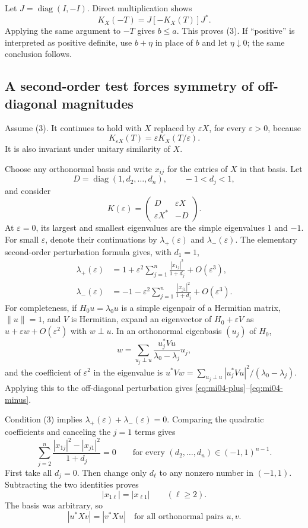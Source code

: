 \documentclass[10pt,a4paper]{article}
\theoremstyle{remark}
\newcommand{\diag}{\operatorname{diag}}
\begin{document}
Let $J=\diag(I,-I)$. Direct multiplication shows
\[
 K_X(-T)=J[-K_X(T)]J^*.
\]
Applying the same argument to $-T$ gives $b\leq a$. This proves (3).
If ``positive'' is interpreted as positive definite, use $b+\eta$ in place of $b$ and let $\eta\downarrow0$; the same conclusion follows.

\subsection{A second-order test forces symmetry of off-diagonal magnitudes}

Assume (3). It continues to hold with $X$ replaced by $\varepsilon X$, for every $\varepsilon>0$, because
\[
 K_{\varepsilon X}(T)=\varepsilon K_X(T/\varepsilon).
\]
It is also invariant under unitary similarity of $X$.

Choose any orthonormal basis and write $x_{ij}$ for the entries of $X$ in that basis. Let
\[
 D=\diag(1,d_2,\ldots,d_n),\qquad -1<d_j<1,
\]
and consider
\[
 K(\varepsilon)=\begin{pmatrix}D&\varepsilon X\\\varepsilon X^*&-D\end{pmatrix}.
\]
At $\varepsilon=0$, its largest and smallest eigenvalues are the simple eigenvalues $1$ and $-1$. For small $\varepsilon$, denote their continuations by $\lambda_+(\varepsilon)$ and $\lambda_-(\varepsilon)$. The elementary second-order perturbation formula gives, with $d_1=1$,
\begin{align}
 \lambda_+(\varepsilon)
 &=1+\varepsilon^2\sum_{j=1}^n\frac{|x_{1j}|^2}{1+d_j}
   +O(\varepsilon^3),\label{eq:mi04-plus}\\
 \lambda_-(\varepsilon)
 &=-1-\varepsilon^2\sum_{j=1}^n\frac{|x_{j1}|^2}{1+d_j}
   +O(\varepsilon^3).\label{eq:mi04-minus}
\end{align}
For completeness, if $H_0u=\lambda_0u$ is a simple eigenpair of a Hermitian matrix, $\|u\|=1$, and $V$ is Hermitian, expand an eigenvector of $H_0+\varepsilon V$ as $u+\varepsilon w+O(\varepsilon^2)$ with $w\perp u$. In an orthonormal eigenbasis $(u_j)$ of $H_0$,
\[
 w=\sum_{u_j\perp u}\frac{u_j^*Vu}{\lambda_0-\lambda_j}u_j,
\]
and the coefficient of $\varepsilon^2$ in the eigenvalue is
$u^*Vw=\sum_{u_j\perp u}|u_j^*Vu|^2/(\lambda_0-\lambda_j)$.
Applying this to the off-diagonal perturbation gives \eqref{eq:mi04-plus}--\eqref{eq:mi04-minus}.

Condition (3) implies $\lambda_+(\varepsilon)+\lambda_-(\varepsilon)=0$. Comparing the quadratic coefficients and canceling the $j=1$ terms gives
\begin{equation}\label{eq:mi04-weights}
 \sum_{j=2}^n\frac{|x_{1j}|^2-|x_{j1}|^2}{1+d_j}=0
 \qquad\text{for every }(d_2,\ldots,d_n)\in(-1,1)^{n-1}.
\end{equation}
First take all $d_j=0$. Then change only $d_\ell$ to any nonzero number in $(-1,1)$. Subtracting the two identities proves
\[
 |x_{1\ell}|=|x_{\ell1}|\qquad(\ell\geq2).
\]
The basis was arbitrary, so
\begin{equation}\label{eq:mi04-pair}
 |u^*Xv|=|v^*Xu|
 \quad\text{for all orthonormal pairs }u,v.
\end{equation}
\end{document}
